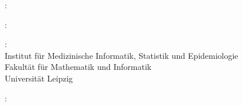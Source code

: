 \thispagestyle{empty}

\hfill

\vfill

\noindent{}: \\
\myName{} %

\medskip

\noindent{}: \\
\emph{\myTitle}

\medskip

\noindent{}: \\
Institut für Medizinische Informatik, Statistik und Epidemiologie \\
Fakultät für Mathematik und Informatik \\
Universität Leipzig

\medskip

\noindent{}: \\
\myProf \\
\myOtherProf \\
\mySupervisor

\medskip


